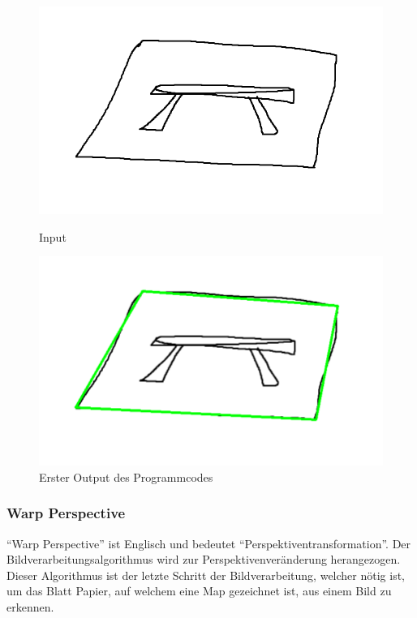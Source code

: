 \begin{figure}[htb]
  \centering
  \begin{minipage}[t]{0.45\linewidth}
    \centering
    \includegraphics[width=\linewidth]{pics/bildverarbeitungsalgos/ApproxPolyDP_input.png}
    \caption{Input}
    \label{maai:approxpolydp:input}
  \end{minipage}
  \hfill
  \begin{minipage}[t]{0.45\linewidth}
    \centering
    \includegraphics[width=\linewidth]{pics/bildverarbeitungsalgos/ApproxPolyDP_output.png}
    \caption{Erster Output des Programmcodes}
    \label{maai:approxpolydp:output}
  \end{minipage}
\end{figure}


\subsubsection{Warp Perspective}\label{maai:wrapPerspective}

``Warp Perspective'' ist Englisch und bedeutet ``Perspektiventransformation''. Der Bildverarbeitungsalgorithmus wird zur Perspektivenveränderung herangezogen. Dieser Algorithmus ist der letzte Schritt der Bildverarbeitung, welcher nötig ist, um das Blatt Papier, auf welchem eine Map gezeichnet ist, aus einem Bild zu erkennen.

